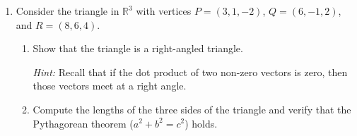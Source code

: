 \documentclass[12pt]{article}
\newcommand{\points}[1]{\marginpar{\hspace{24pt}[#1]}}
\newcommand{\R}{\mathbb{R}}
\begin{document}
\begin{enumerate}
\newpage

\item Consider the triangle in $\R^3$ with vertices $P=(3,1,-2)$, $Q=(6,-1,2)$, and $R=(8,6,4)$.
\begin{enumerate}
 \item Show that the triangle is a right-angled triangle. \points{3}

{\em Hint:} Recall that if the dot product of two non-zero vectors is zero, then those vectors meet at a right angle.

\vspace{4in}

 \item Compute the lengths of the three sides of the triangle and verify that the Pythagorean theorem ($a^2+b^2=c^2$) holds. \points{2}




\end{enumerate}
 
\end{enumerate}
\end{document}
